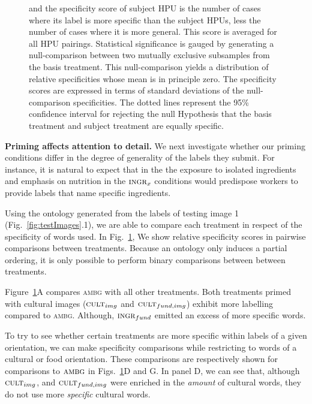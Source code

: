 \documentclass[letterpaper]{article}
\begin{document}
\begin{figure}
\begin{center}
{	and the specificity score of subject HPU is the number of cases where its
	label is more specific than the subject HPUs, less the number of cases 
	where it is more general. This score is 
	averaged for all HPU pairings.  Statistical significance is gauged
	by generating a null-comparison between two mutually exclusive subsamples 
	from the basis treatment.  This null-comparison yields a distribution
	of relative specificities whose mean is in principle zero.  The 
	specificity scores are expressed in terms of standard deviations of
	the null-comparison specificities.  
	The dotted lines represent the 95\% confidence interval for rejecting 
	the null Hypothesis that the basis treatment and subject treatment are
	equally specific.
	}
	\label{fig:specificity}
	\end{center}
\end{figure}

\textbf{Priming affects attention to detail.}
We next investigate whether our priming conditions differ in the degree of 
generality of the labels they submit.  For instance, it is natural to expect
that in the the exposure to isolated ingredients and emphasis on nutrition
in the $\textsc{ingr}_x$ conditions would predispose workers to provide 
labels that name specific ingredients.

Using the ontology generated from the labels of testing image 1 
(Fig.~\ref{fig:testImages}.1), we are able to compare each treatment in respect
of the specificity of words used.  
In Fig.~\ref{fig:specificity}, We show relative specificity scores in 
pairwise comparisons between treatments. Because an ontology only induces a 
partial ordering, it is only possible to perform binary comparisons between
between treatments.

Figure~\ref{fig:specificity}A compares \textsc{ambg} with all other 
treatments.  Both treatments
primed with cultural images ($\textsc{cult}_{img}$ and 
$\textsc{cult}_{fund, img}$) exhibit more labelling compared
to \textsc{ambg}.  Although, $\textsc{ingr}_{fund}$ emitted an excess of 
more specific words.

To try to see whether certain treatments are more specific within labels of 
a given orientation, we can make specificity comparisons while restricting
to words of a cultural or food orientation.  These comparisons are respectively
shown for comparisons to $\textsc{ambg}$ in
Figs.~\ref{fig:specificity}D and G.  In panel D, we can see that, although
$\textsc{cult}_{img}$, and $\textsc{cult}_{fund, img}$ were enriched in the 
\textit{amount} of cultural words, they do not use more \textit{specific}
cultural words.
\end{document}
